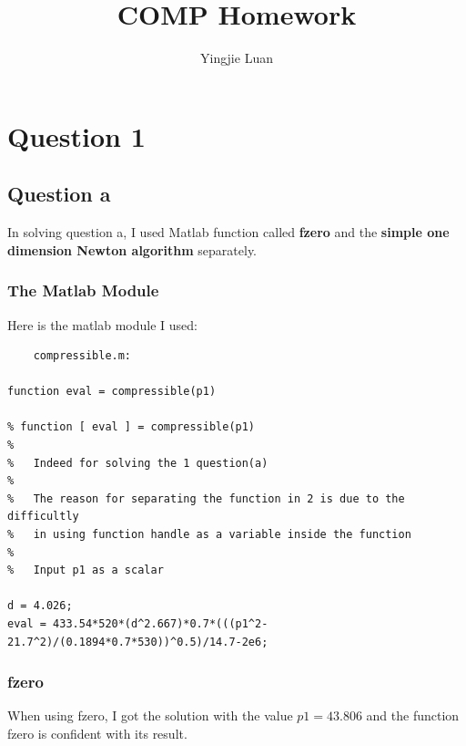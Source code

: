\documentclass[11pt]{article}
\begin{document}
\title{COMP Homework}
\author{Yingjie Luan}
\maketitle

\tableofcontents

\makeatletter
\def\@seccntformat#1{%
  \expandafter\ifx\csname c@#1\endcsname\c@section
  Section \thesection:
  \else
  \csname the#1\endcsname\quad
  \fi}
\makeatother

\section{Question 1}
    \subsection{Question a}
    In solving question a, I used Matlab function called \textbf{fzero} and the \textbf{simple one dimension Newton algorithm} separately.
    
    \subsubsection{The Matlab Module}
    Here is the matlab module I used:
    \begin{verbatim}
    compressible.m:

function eval = compressible(p1)

% function [ eval ] = compressible(p1)
%
%   Indeed for solving the 1 question(a)
%
%   The reason for separating the function in 2 is due to the difficultly
%   in using function handle as a variable inside the function
%
%   Input p1 as a scalar 

d = 4.026;
eval = 433.54*520*(d^2.667)*0.7*(((p1^2-21.7^2)/(0.1894*0.7*530))^0.5)/14.7-2e6;
    \end{verbatim}
    
    \subsubsection{fzero}
    
    When using fzero, I got the solution with the value $p1=43.806$ and the function fzero is confident with its result.\\
\end{document}
